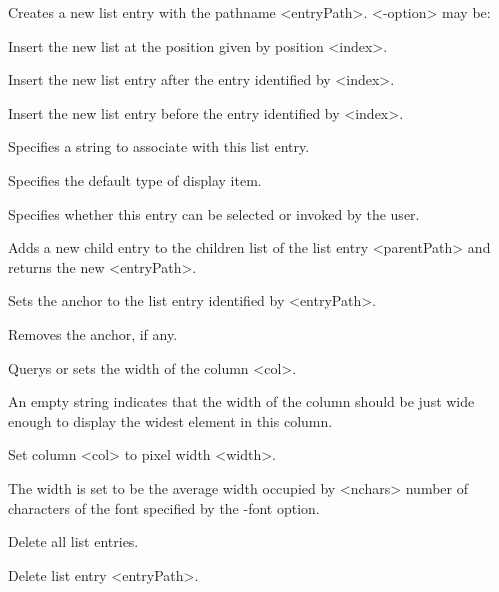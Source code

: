 \vskip5pt

\begin{enum}{1cm}

Creates a new list entry with the pathname <entryPath>.  <-option> may be:

Insert the new list at the position given by position <index>.

Insert the new list entry after the entry identified by <index>.

Insert the new list entry before the entry identified by <index>.

Specifies a string to associate with this list entry.

Specifies the default type of display item.

Specifies whether this entry can be selected or invoked by the user.

Adds a new child entry to the children list of the list entry <parentPath> and returns the
new <entryPath>.

Sets the anchor to the list entry identified by <entryPath>.

Removes the anchor, if any.

Querys or sets the width of the column <col>.

An empty string indicates that the width of the column should be just wide enough to display the widest element in this column.

Set column <col> to pixel width <width>.

The width is set to be the average width occupied by <nchars> number of characters of the font specified by the -font option.

Delete all list entries.

Delete list entry <entryPath>.


\end{enum}
